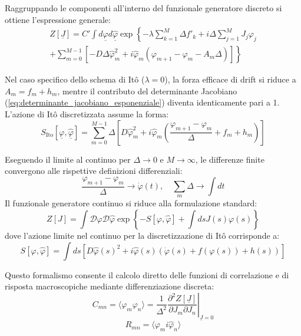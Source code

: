 Raggruppando le componenti all'interno del funzionale generatore discreto si ottiene l'espressione generale:
\begin{align}
Z[\underline{J}] = C' \int d\underline{\varphi} d\underline{\hat{\varphi}} \exp\left\{ -\lambda \sum_{k=1}^{M} \Delta f'_k + i\Delta \sum_{j=1}^{M} J_j \varphi_j \right. \nonumber \\ 
\left. + \sum_{m=0}^{M-1} \left[ -D\Delta\hat{\varphi}_m^2 + i\hat{\varphi}_m(\varphi_{m+1}-\varphi_m-A_m\Delta) \right] \right\}
\end{align}

Nel caso specifico dello schema di Itô ($\lambda=0$), la forza efficace di drift si riduce a $A_m = f_m+h_m$, mentre il contributo del determinante Jacobiano (\ref{eq:determinante_jacobiano_esponenziale}) diventa identicamente pari a 1. L'azione di Itô discretizzata assume la forma:
\begin{equation}
S_{\text{Ito}}[\underline{\varphi},\underline{\hat{\varphi}}] = \sum_{m=0}^{M-1} \Delta \left[ D\hat{\varphi}_m^2 + i\hat{\varphi}_m\left(\frac{\varphi_{m+1}-\varphi_m}{\Delta} + f_m+h_m\right) \right]
\end{equation}

Eseguendo il limite al continuo per $\Delta\to 0$ e $M\to\infty$, le differenze finite convergono alle rispettive definizioni differenziali:
\begin{equation*}
\frac{\varphi_{m+1}-\varphi_m}{\Delta} \to \dot{\varphi}(t), \quad \sum_m \Delta \to \int dt
\end{equation*}
Il funzionale generatore continuo si riduce alla formulazione standard:
\begin{equation}
Z[J] = \int \mathcal{D}\varphi \mathcal{D}\hat{\varphi} \exp\left\{ -S[\varphi,\hat{\varphi}] + \int ds J(s)\varphi(s) \right\}
\end{equation}
dove l'azione limite nel continuo per la discretizzazione di Itô corrisponde a:
\begin{equation}
S[\varphi,\hat{\varphi}] = \int ds \left[ D\hat{\varphi}(s)^2 + i\hat{\varphi}(s)\left(\dot{\varphi}(s) + f(\varphi(s)) + h(s)\right) \right]
\label{eq:azione_ito_continuo_finale}
\end{equation}

Questo formalismo consente il calcolo diretto delle funzioni di correlazione e di risposta macroscopiche mediante differenziazione discreta:
\begin{equation}
C_{mn} = \langle \varphi_m \varphi_n \rangle = \left. \frac{1}{\Delta^2} \frac{\partial^2 Z[\underline{J}]}{\partial J_m \partial J_n} \right|_{\underline{J}=0}
\end{equation}
\begin{equation}
R_{mn} = \langle \varphi_m i\hat{\varphi}_n \rangle
\end{equation}

